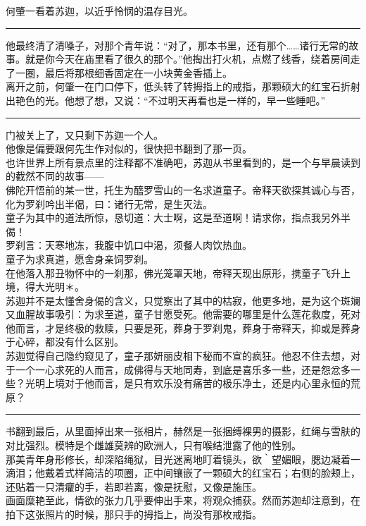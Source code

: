 \documentclass[oneside,11pt]{memoir} %
\begin{document}
\begin{CJK}{UTF8}{gbsn}
    何肇一看着苏迦，以近乎怜悯的温存目光。\\\indent
\rule{-3pt}{30pt}
    他最终清了清嗓子，对那个青年说：“对了，那本书里，还有那个……诸行无常的故事。就是你今天在庙里看了很久的那个。”他掏出打火机，点燃了线香，绕着房间走了一圈，最后将那根细香固定在一小块黄金香插上。\\\indent
    离开之前，何肇一在门口停下，低头转了转拇指上的戒指，那颗硕大的红宝石折射出艳色的光。他想了想，又说：“不过明天再看也是一样的，早一些睡吧。”\\\indent
\rule{-3pt}{30pt}
    门被关上了，又只剩下苏迦一个人。\\\indent
    他像是偏要跟何先生作对似的，很快把书翻到了那一页。\\\indent
    也许世界上所有景点里的注释都不准确吧，苏迦从书里看到的，是一个与早晨读到的截然不同的故事——\\\indent
    佛陀开悟前的某一世，托生为醯罗雪山的一名求道童子。帝释天欲探其诚心与否，化为罗刹吟出半偈，曰：诸行无常，是生灭法。\\\indent
    童子为其中的道法所惊，恳切道：大士啊，这是至道啊！请求你，指点我另外半偈！\\\indent
    罗刹言：天寒地冻，我腹中饥口中渴，须餐人肉饮热血。\\\indent
    童子为求真道，愿舍身亲饲罗刹。\\\indent
    在他落入那丑物怀中的一刹那，佛光笼罩天地，帝释天现出原形，携童子飞升上境，得大光明＊。\\\indent
    苏迦并不是太懂舍身偈的含义，只觉察出了其中的枯寂，他更多地，是为这个斑斓又血腥故事吸引：为求至道，童子甘愿受死。他需要的哪里是什么莲花救度，死对他而言，才是终极的救赎，只要是死，葬身于罗刹鬼，葬身于帝释天，抑或是葬身于心碎，都没有什么区别。\\\indent
    苏迦觉得自己隐约窥见了，童子那妍丽皮相下秘而不宣的疯狂。他忍不住去想，对于一个一心求死的人而言，成佛得与天地同寿，到底是喜乐多一些，还是怨忿多一些？光明上境对于他而言，是只有欢乐没有痛苦的极乐净土，还是内心里永恒的荒原？\\\indent
\rule{-3pt}{30pt}
    书翻到最后，从里面掉出来一张相片，赫然是一张捆缚裸男的摄影，红绳与雪肤的对比强烈。模特是个雌雄莫辨的欧洲人，只有喉结泄露了他的性别。\\\indent
    那美青年身形修长，却深陷绳狱，目光迷离地盯着镜头，欲｀望媚眼，腮边凝着一滴泪；他戴着式样简洁的项圈，正中间镶嵌了一颗硕大的红宝石；右侧的脸颊上，还贴着一只清癯的手，若即若离，像是抚慰，又像是施压。\\\indent
    画面糜艳至此，情欲的张力几乎要伸出手来，将观众捕获。然而苏迦却注意到，在拍下这张照片的时候，那只手的拇指上，尚没有那枚戒指。\\\indent

\end{CJK}
\end{document}
